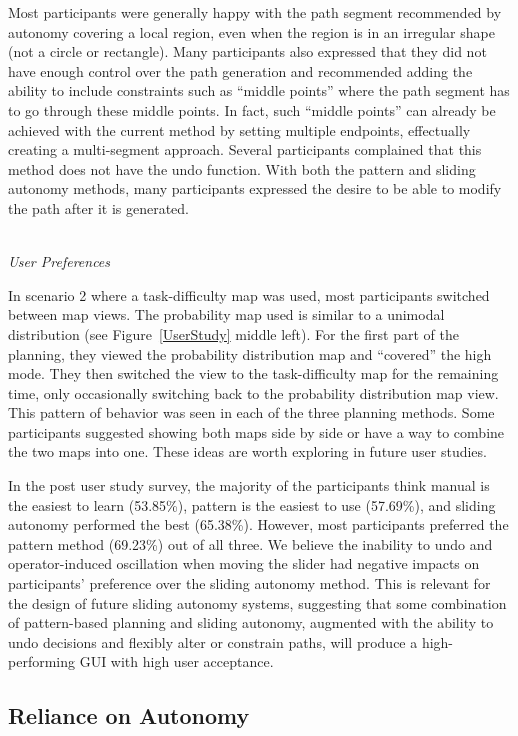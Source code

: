 Most participants were generally happy with the path segment recommended by autonomy covering a local region, even when the region is in an irregular shape (not a circle or rectangle). Many participants also expressed that they did not have enough control over the path generation and recommended adding the ability to include constraints such as ``middle points'' where the path segment has to go through these middle points. In fact, such ``middle points'' can already be achieved with the current method by setting multiple endpoints, effectually creating a multi-segment approach. Several participants complained that this method does not have the undo function. With both the pattern and sliding autonomy methods, many participants expressed the desire to be able to modify the path after it is generated.

~\\ \noindent \textit{User Preferences}

In scenario 2 where a task-difficulty map was used, most participants switched between map views. The probability map used is similar to a unimodal distribution (see Figure~\ref{UserStudy} middle left). For the first part of the planning, they viewed the probability distribution map and ``covered'' the high mode. They then switched the view to the task-difficulty map for the remaining time, only occasionally switching back to the probability distribution map view. This pattern of behavior was seen in each of the three planning methods. Some participants suggested showing both maps side by side or have a way to combine the two maps into one. These ideas are worth exploring in future user studies.

In the post user study survey, the majority of the participants think manual is the easiest to learn (53.85\%), pattern is the easiest to use (57.69\%), and sliding autonomy performed the best (65.38\%). However, most participants preferred the pattern method (69.23\%) out of all three. We believe the inability to undo and operator-induced oscillation when moving the slider had negative impacts on participants' preference over the sliding autonomy method. This is relevant for the design of future sliding autonomy systems, suggesting that some combination of pattern-based planning and sliding autonomy, augmented with the ability to undo decisions and flexibly alter or constrain paths, will produce a high-performing GUI with high user acceptance.

\subsection{Reliance on Autonomy}
\label{Reliance}

